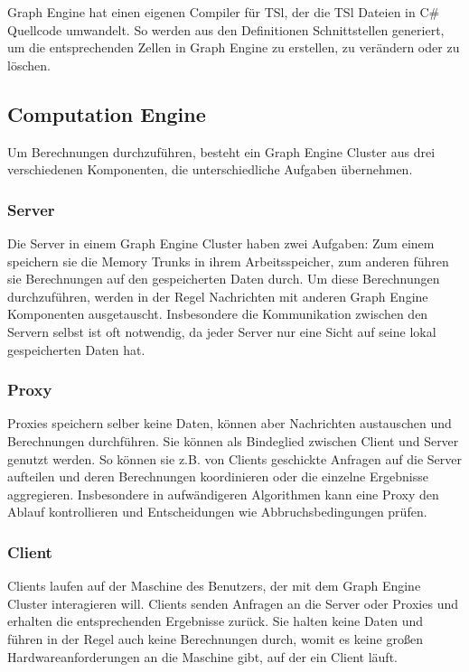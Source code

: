 Graph Engine hat einen eigenen Compiler für TSl, der die TSl Dateien in C\# Quellcode umwandelt. So werden aus den Definitionen Schnittstellen
generiert, um die entsprechenden Zellen in Graph Engine zu erstellen, zu verändern oder zu löschen. 

\subsection{Computation Engine}

Um Berechnungen durchzuführen, besteht ein Graph Engine Cluster aus drei verschiedenen Komponenten, die unterschiedliche Aufgaben übernehmen.


\subsubsection{Server}

Die Server in einem Graph Engine Cluster haben zwei Aufgaben: Zum einem speichern sie die Memory Trunks in ihrem Arbeitsspeicher, 
zum anderen führen sie Berechnungen auf den gespeicherten Daten durch.
Um diese Berechnungen durchzuführen, werden in der Regel Nachrichten mit anderen Graph Engine Komponenten ausgetauscht. Insbesondere die Kommunikation zwischen den Servern
selbst ist oft notwendig, da jeder Server nur eine Sicht auf seine lokal gespeicherten Daten hat.

\subsubsection{Proxy}

Proxies speichern selber keine Daten, können aber Nachrichten austauschen und Berechnungen durchführen. Sie können als 
Bindeglied zwischen Client und Server genutzt werden. So können sie z.B. von Clients geschickte Anfragen auf die Server aufteilen und deren
Berechnungen koordinieren oder die einzelne Ergebnisse aggregieren. Insbesondere in aufwändigeren Algorithmen kann eine Proxy 
den Ablauf kontrollieren und Entscheidungen wie Abbruchsbedingungen prüfen.

\subsubsection{Client}

Clients laufen auf der Maschine des Benutzers, der mit dem Graph Engine Cluster interagieren will. Clients senden Anfragen an die Server oder Proxies und
erhalten die entsprechenden Ergebnisse zurück. Sie halten keine Daten und führen in der Regel auch keine Berechnungen durch, womit es keine großen Hardwareanforderungen
an die Maschine gibt, auf der ein Client läuft.

